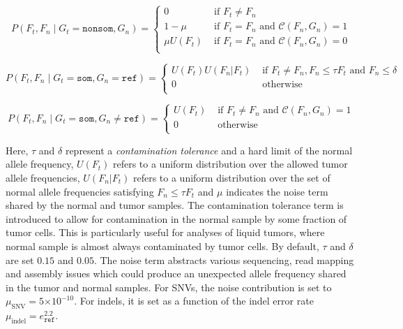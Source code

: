 \documentclass{article}
\newcommand{\e}[1]{\ensuremath{\times 10^{#1}}}
\begin{document}
\begin{equation*}
P(F_t, F_n \mid G_t = \texttt{nonsom}, G_n)=
\begin{cases}
	0 & \text{ if } F_t \neq F_n \\
	1-\mu & \text{ if } F_t = F_n \text{ and }\mathcal{C}(F_n, G_n) = 1 \\
	\mu U(F_t) & \text{ if } F_t = F_n \text{ and }\mathcal{C}(F_n, G_n) = 0 \\
\end{cases}
\end{equation*}

\begin{equation*}
P(F_t, F_n \mid G_t = \texttt{som}, G_n = \texttt{ref})=
\begin{cases}
	U(F_t) U(F_n|F_t) & \text{ if } F_t \neq F_n, F_n \leq \tau F_t \text { and } F_n \leq \delta \\
	0 & \text{ otherwise } \\
\end{cases}
\end{equation*}

\begin{equation*}
P(F_t, F_n \mid G_t = \texttt{som}, G_n \neq \texttt{ref})=
\begin{cases}
	U(F_t) & \text{ if } F_t \neq F_n \text{ and } \mathcal{C}(F_n, G_n) = 1 \\
	0 & \text{ otherwise } \\
\end{cases}
\end{equation*}

\noindent Here, $\tau$ and $\delta$ represent a {\em contamination tolerance} and a hard limit of the normal allele frequency, $U(F_t)$ refers to a uniform distribution over the allowed tumor allele frequencies, $U(F_n|F_t)$ refers to a uniform distribution over the set of normal allele frequencies satisfying $F_n \leq \tau F_t$ and $\mu$ indicates the noise term shared by the normal and tumor samples. The contamination tolerance term is introduced to allow for contamination in the normal sample by some fraction of tumor cells. This is particularly useful for analyses of liquid tumors, where normal sample is almost always contaminated by tumor cells. By default, $\tau$ and $\delta$ are set $0.15$ and $0.05$. The noise term abstracts various sequencing, read mapping and assembly issues which could produce an unexpected allele frequency shared in the tumor and normal samples. For SNVs, the noise contribution is set to $\mu_{\text{SNV}} = 5\e{-10}$. For indels, it is set as a function of the indel error rate $\mu_{\text{indel}} = e_\texttt{ref}^{2.2}$.
\end{document}
